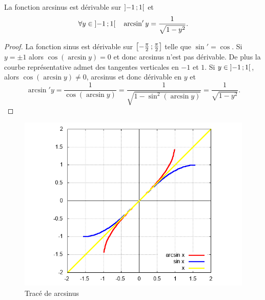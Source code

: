 %
\begin{prop}
  La fonction arcsinus est dérivable sur $\left] -1 \, ;  1 \right[$ et
  \begin{equation}
    \forall y \in \left] -1 \, ;  1 \right[ \quad \arcsin'y = \frac{1}{\sqrt{1-y^2}}.
  \end{equation}
\end{prop}
\begin{proof}
  La fonction sinus est dérivable sur $\left[ -\frac{\pi}{2} \, ;  \frac{\pi}{2} \right]$ telle que $\sin'=\cos$. Si $y=\pm 1$ alors $\cos(\arcsin y)=0$ et donc arcsinus n'est pas dérivable. De plus la courbe représentative admet des tangentes verticales en $-1$ et $1$. Si $y \in \left] -1 \, ;  1 \right[$, alors $\cos(\arcsin y) \neq 0$, arcsinus et donc dérivable en $y$ et
  \begin{equation}
    \arcsin' y = \frac{1}{\cos( \arcsin y)}=\frac{1}{\sqrt{1-\sin^2(\arcsin y)}}=\frac{1}{\sqrt{1-y^2}}.
  \end{equation}
\end{proof}
\begin{figure}
  \centering
  \includegraphics[scale=0.4,angle=-90]{arcsin.png}
  \caption{Tracé de arcsinus}
  \label{fig:tracearcsinus}
\end{figure}
%
